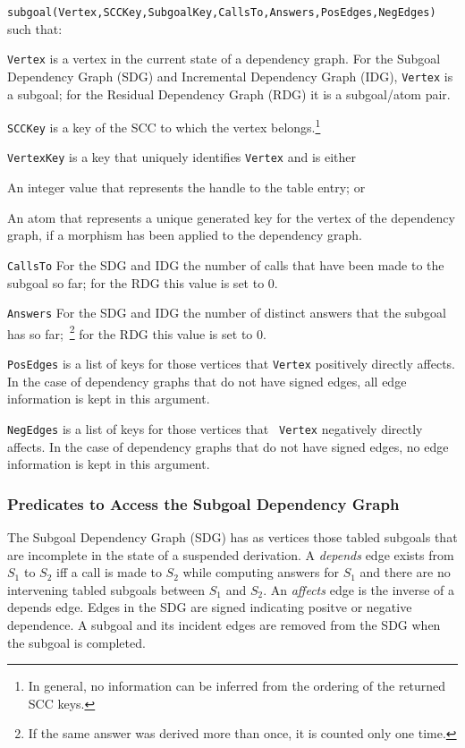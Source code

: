 {\small
\noindent
{\tt subgoal(Vertex,SCCKey,SubgoalKey,CallsTo,Answers,PosEdges,NegEdges)} 
}
such that:

\bi
\item {\tt Vertex} is a vertex in the current state of a dependency
  graph.  For the Subgoal Dependency Graph (SDG) and Incremental
  Dependency Graph (IDG), {\tt Vertex} is a subgoal; for the Residual
  Dependency Graph (RDG) it is a subgoal/atom pair.
\item {\tt SCCKey} is a key of the SCC to which the vertex
  belongs.\footnote{In general, no information can be inferred from
    the ordering of the returned SCC keys.}
\item {\tt VertexKey} is a key that uniquely identifies {\tt Vertex}
  and is either 
%
\bi
  \item An integer value that represents the handle to the table
    entry; or 
  \item An atom that represents a unique generated key for the vertex of
    the dependency graph, if a morphism has been applied to the
    dependency graph.  \ei
\item {\tt CallsTo} For the SDG and IDG the number of calls that have
  been made to the subgoal so far; for the RDG this value is set to 0.
\item {\tt Answers} For the SDG and IDG the number of distinct answers
  that the subgoal has so far;~\footnote{If the same answer was
    derived more than once, it is counted only one time.} for the RDG
  this value is set to 0.
\item {\tt PosEdges} is a list of keys for those vertices that {\tt Vertex}
  positively directly affects.  In the case of dependency graphs that
  do not have signed edges, all edge information is kept in this
  argument.
\item {\tt NegEdges} is a list of keys for those vertices that {\tt
  Vertex} negatively directly affects.  In the case of dependency
  graphs that do not have signed edges, no edge information is kept in
  this argument.  \ei

\subsubsection{Predicates to Access the Subgoal Dependency Graph} \label{sec:sdg-preds}

The Subgoal Dependency Graph (SDG) has as vertices those tabled
subgoals that are incomplete in the state of a suspended derivation.
A {\em depends} edge exists from $S_1$ to $S_2$ iff a call is made to
$S_2$ while computing answers for $S_1$ and there are no
intervening tabled subgoals between $S_1$ and $S_2$.  An {\em affects}
edge is the inverse of a depends edge.  Edges in the SDG are signed
indicating positve or negative dependence.  A subgoal and its incident
edges are removed from the SDG when the subgoal is completed.

